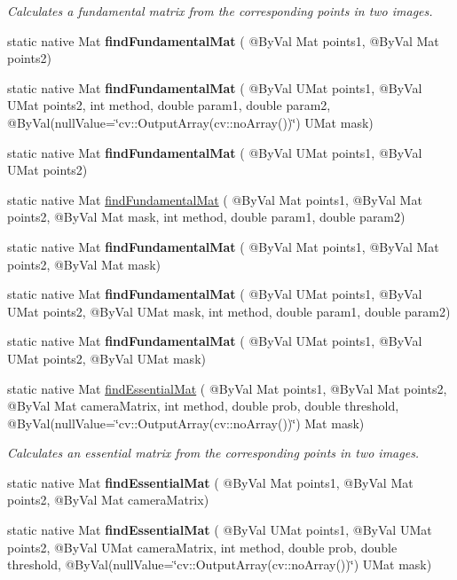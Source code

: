 \begin{DoxyCompactItemize}
\begin{DoxyCompactList}\small\item\em Calculates a fundamental matrix from the corresponding points in two images. \end{DoxyCompactList}\item 
static native Mat {\bfseries find\+Fundamental\+Mat} ( @By\+Val Mat points1, @By\+Val Mat points2)
\item 
static native Mat {\bfseries find\+Fundamental\+Mat} ( @By\+Val U\+Mat points1, @By\+Val U\+Mat points2, int method, double param1, double param2, @By\+Val(null\+Value=\char`\"{}cv\+::\+Output\+Array(cv\+::no\+Array())\char`\"{}) U\+Mat mask)
\item 
static native Mat {\bfseries find\+Fundamental\+Mat} ( @By\+Val U\+Mat points1, @By\+Val U\+Mat points2)
\item 
static native Mat \hyperlink{group__calib3d_ga1a8446757231db93d44c99331ac4747d}{find\+Fundamental\+Mat} ( @By\+Val Mat points1, @By\+Val Mat points2, @By\+Val Mat mask, int method, double param1, double param2)
\item 
static native Mat {\bfseries find\+Fundamental\+Mat} ( @By\+Val Mat points1, @By\+Val Mat points2, @By\+Val Mat mask)
\item 
static native Mat {\bfseries find\+Fundamental\+Mat} ( @By\+Val U\+Mat points1, @By\+Val U\+Mat points2, @By\+Val U\+Mat mask, int method, double param1, double param2)
\item 
static native Mat {\bfseries find\+Fundamental\+Mat} ( @By\+Val U\+Mat points1, @By\+Val U\+Mat points2, @By\+Val U\+Mat mask)
\item 
static native Mat \hyperlink{group__calib3d_gad86954f592d1f99b0f8cdec7f4134c7a}{find\+Essential\+Mat} ( @By\+Val Mat points1, @By\+Val Mat points2, @By\+Val Mat camera\+Matrix, int method, double prob, double threshold, @By\+Val(null\+Value=\char`\"{}cv\+::\+Output\+Array(cv\+::no\+Array())\char`\"{}) Mat mask)
\begin{DoxyCompactList}\small\item\em Calculates an essential matrix from the corresponding points in two images. \end{DoxyCompactList}\item 
static native Mat {\bfseries find\+Essential\+Mat} ( @By\+Val Mat points1, @By\+Val Mat points2, @By\+Val Mat camera\+Matrix)
\item 
static native Mat {\bfseries find\+Essential\+Mat} ( @By\+Val U\+Mat points1, @By\+Val U\+Mat points2, @By\+Val U\+Mat camera\+Matrix, int method, double prob, double threshold, @By\+Val(null\+Value=\char`\"{}cv\+::\+Output\+Array(cv\+::no\+Array())\char`\"{}) U\+Mat mask)

\end{DoxyCompactItemize}
